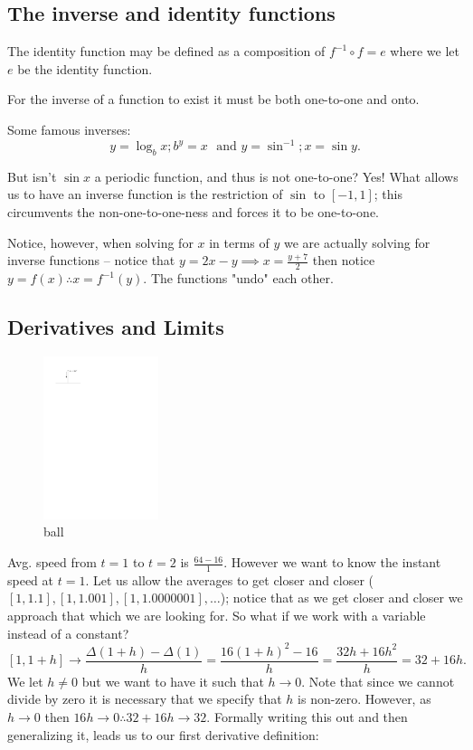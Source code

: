 \documentclass{article}
\begin{document}
\subsection{The inverse and identity functions}

\begin{theorem}
  The identity function may be defined as a composition of $f^{-1} \circ f=e$ where we let $e$ be the identity function.
\end{theorem}

\begin{theorem}
  For the inverse of a function to exist it must be both one-to-one and onto.
\end{theorem}


Some famous inverses:
\[
  y = \log_b x ; b^y=x \,\,\,\, \text{and }
  y = \sin ^{-1}; x=\sin  y
.\] 

But isn't \( \sin x \) a periodic function, and thus is not one-to-one? Yes! What allows us to have an inverse function is the restriction of \( \sin  \) to \( [-1,1] \); this circumvents the non-one-to-one-ness and forces it to be one-to-one. 

Notice, however, when solving for $x$ in terms of $y$ we are actually solving for inverse functions -- notice that $y=2x-y\implies x=\frac{y+7}{2}$ then notice $y=f(x) \therefore x=f^{-1} (y)$. The functions "undo" each other. 
\pagebreak
\subsection{Derivatives and Limits}

\begin{figure}[ht]
    \centering
 \includegraphics[width=0.3\textwidth]{./figures/ball.pdf}
    \caption{ball}
    \label{fig:ball}
\end{figure}

Avg. speed from \( t=1 \) to \(  t=2 \) is \( \frac{64-16}{1} \). However we want to know the instant speed at \( t=1 \). Let us allow the averages to get closer and closer (\( [1,1.1],[1,1.001],[1,1.0000001],\ldots  \)); notice that as we get closer and closer we approach that which we are looking for. So what if we work with a variable instead of a constant? 
\[
  [1,1+h] \longrightarrow \frac{\Delta(1+h)-\Delta(1)}{h}=\frac{16(1+h)^2-16}{h}=\frac{32h+16h^2}{h}=32+16h
.\] 
We let $h\neq 0$ but we want to have it such that \( h \to 0 \). Note that since we cannot divide by zero it is necessary that we specify that $h$ is non-zero. However, as \( h\to 0 \) then $16h\to 0\therefore 32+16h \to 32$. Formally writing this out and then generalizing it, leads us to our first derivative definition:
\end{document}
